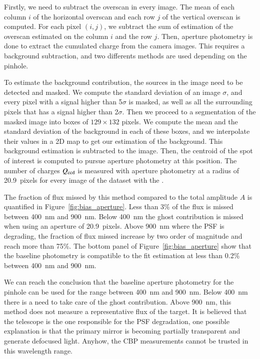 Firstly, we need to subtract the overscan in every image. The mean of each column $i$ of the horizontal overscan and each row $j$ of the vertical overscan is computed. For each pixel $(i, j)$, we subtract the sum of estimation of the overscan estimated on the column $i$ and the row $j$.
Then, aperture photometry is done to extract the cumulated charge from the \SD camera images. This requires a background subtraction, and two differents methods are used depending on the pinhole.

To estimate the background contribution, the sources in the image need to be detected and masked. We compute the standard deviation of an image $\sigma$, and every pixel with a signal higher than 5$\sigma$ is masked, as well as all the surrounding pixels that has a signal higher than 2$\sigma$. Then we proceed to a segmentation of the masked image into boxes of $129\times132$ pixels. We compute the mean and the standard deviation of the background in each of these boxes, and we interpolate their values in a 2D map to get our estimation of the background. This background estimation is subtracted to the image. Then, the centroid of the spot of interest is computed to pursue aperture photometry at this position. The number of charges $Q_{\mathrm{ccd}}$ is measured with aperture photometry at a radius of \SI{20.9}{pixels} for every image of the dataset with the \spinhole.

The fraction of flux missed by this method compared to the total amplitude $A$ is quantified in Figure~\ref{fig:bias_aperture}. Less than 3\% of the flux is missed between \SI{400}{\nano\meter} and \SI{900}{\nano\meter}. Below \SI{400}{\nano\meter} the ghost contribution is missed when using an aperture of \SI{20.9}{pixels}. Above \SI{900}{\nano\meter} where the PSF is degrading, the fraction of flux missed increase by two order of magnitude and reach more than 75\%. The bottom panel of Figure~\ref{fig:bias_aperture} show that the baseline photometry is compatible to the fit estimation at less than 0.2\% between \SI{400}{\nano\meter} and \SI{900}{\nano\meter}. 

We can reach the conclusion that the baseline aperture photometry for the \spinhole pinhole can be used for the range between \SI{400}{\nano\meter} and \SI{900}{\nano\meter}. Below \SI{400}{\nano\meter} there is a need to take care of the ghost contribution. Above \SI{900}{\nano\meter}, this method does not measure a representative flux of the target. It is believed that the \SD telescope is the one responsible for the PSF degradation, one possible explanation is that the primary mirror is becoming partially transparent and generate defocused light. Anyhow, the CBP measurements cannot be trusted in this wavelength range. 

